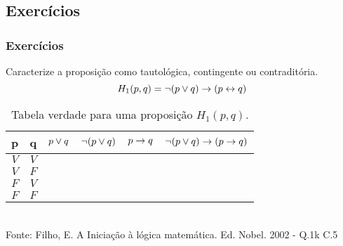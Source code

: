 \subsection{Exercícios}
%
\begin{frame}[t]
    \frametitle{Exercícios}
    \begin{exampleblock}{Caracterize a proposição como tautológica, contingente ou contraditória.}
        \begin{equation}
            H_1(p,q) = \lnot (p \lor q) \rightarrow (p \leftrightarrow q)
        \end{equation}
    \end{exampleblock}
    \begin{table}[]
        \caption{Tabela verdade para uma proposição $H_1(p,q)$.}
        \label{tab:exercise-21}
        \begin{tabular}{|c|c|c|c|c|c|}
            \hline
            \rowcolor[HTML]{EFEFEF} 
            \textbf{p} & \textbf{q} & $p \lor q$ & $\lnot (p \lor q) $ & $p \rightarrow q$ & $\lnot (p \lor q) \rightarrow (p \rightarrow q)$ \\ \hline
            $V$        & $V$        &           &              &            &                                \\ \hline
            $V$        & $F$        &           &              &            &                                \\ \hline
            $F$        & $V$        &           &              &            &                                \\ \hline
            $F$        & $F$        &           &              &            &                                \\ \hline
        \end{tabular}
        \\
        \centering \tiny{Fonte: Filho, E. A Iniciação à lógica matemática. Ed. Nobel. 2002 - Q.1k C.5}
    \end{table}
\end{frame}
%
